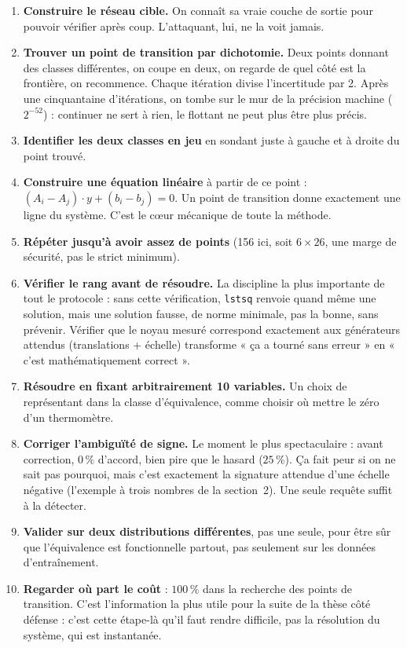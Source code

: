 \documentclass[11pt]{article}
\begin{document}
\begin{enumerate}[leftmargin=1.4em]
  \item \textbf{Construire le réseau cible.} On connaît sa vraie couche de
    sortie pour pouvoir vérifier après coup. L'attaquant, lui, ne la voit
    jamais.
  \item \textbf{Trouver un point de transition par dichotomie.} Deux points
    donnant des classes différentes, on coupe en deux, on regarde de quel
    côté est la frontière, on recommence. Chaque itération divise
    l'incertitude par 2. Après une cinquantaine d'itérations, on tombe sur
    le mur de la précision machine ($2^{-52}$) : continuer ne sert à rien,
    le flottant ne peut plus être plus précis.
  \item \textbf{Identifier les deux classes en jeu} en sondant juste à
    gauche et à droite du point trouvé.
  \item \textbf{Construire une équation linéaire} à partir de ce point :
    $(A_i - A_j)\cdot y + (b_i - b_j) = 0$. Un point de transition donne
    exactement une ligne du système. C'est le cœur mécanique de toute la
    méthode.
  \item \textbf{Répéter jusqu'à avoir assez de points} (156 ici, soit
    $6 \times 26$, une marge de sécurité, pas le strict minimum).
  \item \textbf{Vérifier le rang avant de résoudre.} La discipline la plus
    importante de tout le protocole : sans cette vérification,
    \texttt{lstsq} renvoie quand même une solution, mais une solution
    fausse, de norme minimale, pas la bonne, sans prévenir. Vérifier que le
    noyau mesuré correspond exactement aux générateurs attendus
    (translations + échelle) transforme « ça a tourné sans erreur » en
    « c'est mathématiquement correct ».
  \item \textbf{Résoudre en fixant arbitrairement 10 variables.} Un choix
    de représentant dans la classe d'équivalence, comme choisir où mettre
    le zéro d'un thermomètre.
  \item \textbf{Corriger l'ambiguïté de signe.} Le moment le plus
    spectaculaire : avant correction, $0\,\%$ d'accord, bien pire que le
    hasard ($25\,\%$). Ça fait peur si on ne sait pas pourquoi, mais c'est
    exactement la signature attendue d'une échelle négative (l'exemple à
    trois nombres de la section~2). Une seule requête suffit à la
    détecter.
  \item \textbf{Valider sur deux distributions différentes}, pas une
    seule, pour être sûr que l'équivalence est fonctionnelle partout, pas
    seulement sur les données d'entraînement.
  \item \textbf{Regarder où part le coût} : $100\,\%$ dans la recherche des
    points de transition. C'est l'information la plus utile pour la suite
    de la thèse côté défense : c'est cette étape-là qu'il faut rendre
    difficile, pas la résolution du système, qui est instantanée.
\end{enumerate}
\end{document}
